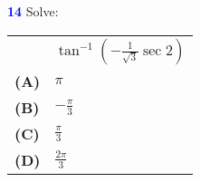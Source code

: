 \documentclass[12pt]{article}
\begin{document}
\vspace{0.5cm}

\textbf{\textcolor{blue}{14}} Solve:

\begin{flushleft}
    \begin{tabular}{l l}
        & \( \tan^{-1} \left( -\frac{1}{\sqrt{3}} \sec 2 \right) \)  \\[10pt]
        \textbf{(A)} & \( \pi \)  \\[5pt]
        \textbf{(B)} & \( -\frac{\pi}{3} \)  \\[5pt]
        \textbf{(C)} & \( \frac{\pi}{3} \)  \\[5pt]
        \textbf{(D)} & \( \frac{2\pi}{3} \)
    \end{tabular}
\end{flushleft}
\end{document}
